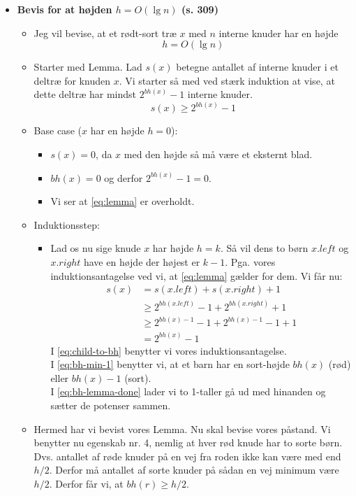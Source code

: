 \begin{itemize}
\item \textbf{Bevis for at højden $h = O(\lg n)$ (s. 309)}
\begin{itemize}
	\item Jeg vil bevise, at et rødt-sort træ $x$ med $n$ interne knuder har en højde
	$$
	h = O(\lg n)
	$$
	\item Starter med Lemma. Lad $s(x)$ betegne antallet af interne knuder i et deltræ for knuden $x$. Vi starter så med ved stærk induktion at vise, at dette deltræ har mindst $2^{bh(x)} - 1$ interne knuder.
	\begin{equation} \label{eq:lemma}
	s(x) \geq 2^{bh(x)} - 1
	\end{equation}
	\item Base case ($x$ har en højde $h = 0$):
	\begin{itemize}
		\item $s(x) = 0$, da $x$ med den højde så må være et eksternt blad.
		\item $bh(x) = 0$ og derfor $2^{bh(x)} - 1 = 0$.
		\item Vi ser at \cref{eq:lemma} er overholdt.
	\end{itemize}
	\item Induktionsstep:
	\begin{itemize}
		\item Lad os nu sige knude $x$ har højde $h = k$. Så vil dens to børn $x.left$ og $x.right$ have en højde der højest er $k-1$. Pga. vores induktionsantagelse ved vi, at \cref{eq:lemma} gælder for dem. Vi får nu:
		\begin{align}
		s(x) &= s(x.left) + s(x.right) + 1\\
		     &\geq 2^{bh(x.left)} - 1 + 2^{bh(x.right)} + 1 \label{eq:child-to-bh} \\
		     &\geq 2^{bh(x)-1} - 1 + 2^{bh(x)-1} - 1 + 1 \label{eq:bh-min-1} \\
		     &= 2^{bh(x)} - 1 \label{eq:bh-lemma-done}
		\end{align}
		I \cref{eq:child-to-bh} benytter vi vores induktionsantagelse.\\
		I \cref{eq:bh-min-1} benytter vi, at et barn har en sort-højde $bh(x)$ (rød) eller $bh(x) - 1$ (sort).\\
		I \cref{eq:bh-lemma-done} lader vi to 1-taller gå ud med hinanden og sætter de potenser sammen.
	\end{itemize}
	\item Hermed har vi bevist vores Lemma. Nu skal bevise vores påstand. Vi benytter nu egenskab nr. 4, nemlig at hver rød knude har to sorte børn. Dvs. antallet af røde knuder på en vej fra roden ikke kan være med end $h/2$. Derfor må antallet af sorte knuder på sådan en vej minimum være $h/2$. Derfor får vi, at $bh(r) \geq h/2$.

\end{itemize}
\end{itemize}

